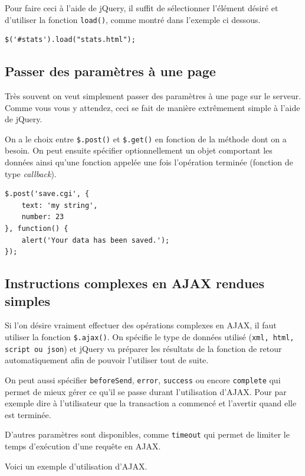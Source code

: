 \documentclass[10pt,a4paper,titlepage]{article}
\begin{document}
Pour faire ceci à l'aide de jQuery, il suffit de sélectionner l'élément désiré et d'utiliser la fonction \texttt{load()}, comme montré dans l'exemple ci dessous. 

\begin{lstlisting}
$('#stats').load("stats.html");
\end{lstlisting}


\subsection{Passer des paramètres à une page}

Très souvent on veut simplement passer des paramètres à une page sur le serveur. Comme vous vous y attendez, ceci se fait de manière extrêmement simple à l'aide de jQuery. 

On a le choix entre \texttt{\$.post()} et \texttt{\$.get()} en fonction de la méthode dont on a besoin. On peut ensuite spécifier optionnellement un objet comportant les données ainsi qu'une fonction appelée une fois l'opération terminée (fonction de type \emph{callback}).

\begin{lstlisting}
$.post('save.cgi', {
    text: 'my string',
    number: 23
}, function() {
    alert('Your data has been saved.');
});
\end{lstlisting}
                                   
\subsection{Instructions complexes en AJAX rendues simples}

Si l'on désire vraiment effectuer des opérations complexes en AJAX, il faut utiliser la fonction \texttt{\$.ajax()}. On spécifie le type de données utilisé (\texttt{xml, html, script ou json}) et jQuery va préparer les résultats de la fonction de retour automatiquement afin de pouvoir l'utiliser tout de suite. 

On peut aussi spécifier \texttt{beforeSend}, \texttt{error}, \texttt{success} ou encore \texttt{complete} qui permet de mieux gérer ce qu'il se passe durant l'utilisation d'AJAX. Pour par exemple dire à l'utilisateur que la transaction a commencé et l'avertir quand elle est terminée.

D'autres paramètres sont disponibles, comme \texttt{timeout} qui permet de limiter le temps d'exécution d'une requête en AJAX.

Voici un exemple d'utilisation d'AJAX. 
\end{document}

